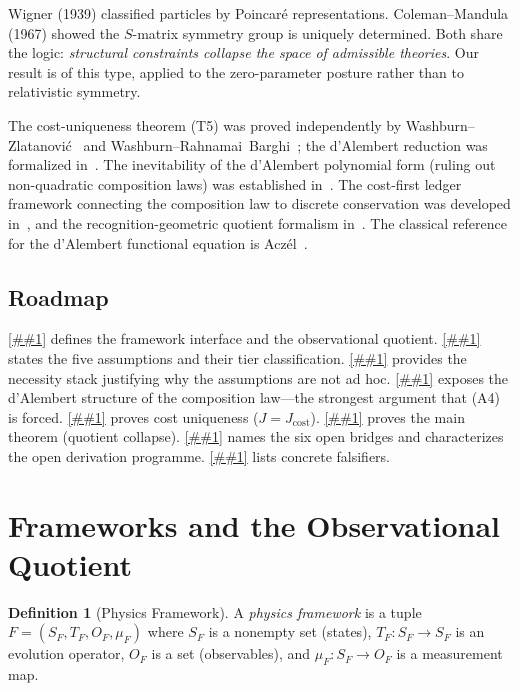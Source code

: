 \documentclass[11pt]{article}
\providecommand{\Cref}[1]{\ref{##1}}%
\newcommand{\Jcost}{J_{\mathrm{cost}}}
\theoremstyle{definition}
\newtheorem{definition}[theorem]{Definition}
\theoremstyle{remark}
\begin{document}
Wigner (1939) classified particles by Poincar\'e representations.
Coleman--Mandula (1967) showed the $S$-matrix symmetry group
is uniquely determined.
Both share the logic: \emph{structural constraints collapse
the space of admissible theories}.
Our result is of this type, applied to the zero-parameter posture
rather than to relativistic symmetry.

The cost-uniqueness theorem (T5) was proved independently by
Washburn--Zlatanovi\'c~\cite{WZ2026} and
Washburn--Rahnamai~Barghi~\cite{Barghi2026};
the d'Alembert reduction was formalized in~\cite{DAlembert2026}.
The inevitability of the d'Alembert polynomial form (ruling out
non-quadratic composition laws) was established
in~\cite{Inevitability2026}.
The cost-first ledger framework connecting the composition law
to discrete conservation was developed in~\cite{CostLedger2026},
and the recognition-geometric quotient formalism
in~\cite{RecogGeom2026}.
The classical reference for the d'Alembert functional equation is
Acz\'el~\cite{Aczel1966}.

\subsection{Roadmap}

\Cref{sec:framework} defines the framework interface and the
observational quotient.
\Cref{sec:assumptions} states the five assumptions and their tier
classification.
\Cref{sec:necessity} provides the necessity stack justifying
why the assumptions are not ad hoc.
\Cref{sec:dalembert} exposes the d'Alembert structure of the
composition law---the strongest argument that (A4) is forced.
\Cref{sec:t5} proves cost uniqueness ($J = \Jcost$).
\Cref{sec:main} proves the main theorem (quotient collapse).
\Cref{sec:bridges} names the six open bridges and
characterizes the open derivation programme.
\Cref{sec:falsifiers} lists concrete falsifiers.

\section{Frameworks and the Observational Quotient}\label{sec:framework}

\begin{definition}[Physics Framework]\label{def:framework}
A \emph{physics framework} is a tuple
$F = (S_F, T_F, O_F, \mu_F)$
where $S_F$ is a nonempty set (states),
$T_F : S_F \to S_F$ is an evolution operator,
$O_F$ is a set (observables),
and $\mu_F : S_F \to O_F$ is a measurement map.
\end{definition}
\end{document}
